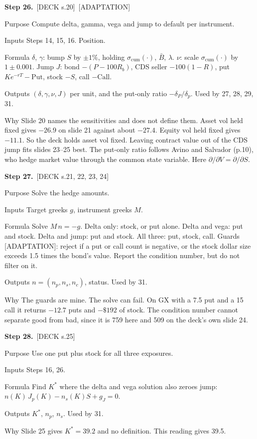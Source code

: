 \documentclass[10pt,a4paper]{article}
\newcommand{\DECK}[1]{\textsf{\footnotesize\textcolor{tagdeck}{[DECK s.#1]}}}
\newcommand{\ADAPT}{\textsf{\footnotesize\textcolor{tagadapt}{[ADAPTATION]}}}
\newenvironment{step}[3]{%
  \par\needspace{5\baselineskip}\medskip\noindent\textbf{Step #1.}\ \fn{#2}\hfill#3\par\nopagebreak\small
  \begin{description}[style=sameline,leftmargin=1.7cm,labelwidth=1.5cm,labelsep=0.2cm,itemsep=1pt,parsep=0pt,topsep=1pt,font=\small\bfseries]
}{\end{description}\normalsize}
\newcommand{\Bbar}{\bar{B}}
\newcommand{\scum}{\sigma_{\mathrm{cum}}}
\begin{document}
\begin{step}{26}{fk_greeks}{\DECK{20}\ \ADAPT}
\item[Purpose] Compute delta, gamma, vega and jump to default per instrument.
\item[Inputs] Steps 14, 15, 16. Position.
\item[Formula] $\delta$, $\gamma$: bump $S$ by $\pm1\%$, holding $\scum(\cdot)$, $\Bbar$, $\lambda$. $\nu$: scale $\scum(\cdot)$ by $1\pm0.001$. Jump $J$: bond $-(P-100R_b)$, CDS seller $-100(1-R)$, put $Ke^{-rT}-\text{Put}$, stock $-S$, call $-\text{Call}$.
\item[Outputs] $(\delta,\gamma,\nu,J)$ per unit, and the put-only ratio $-\delta_P/\delta_p$. Used by 27, 28, 29, 31.
\item[Why] Slide 20 names the sensitivities and does not define them. Asset vol held fixed gives $-26.9$ on slide 21 against about $-27.4$. Equity vol held fixed gives $-11.1$. So the deck holds asset vol fixed. Leaving contract value out of the CDS jump fits slides 23--25 best. The put-only ratio follows Avino and Salvador (p.10), who hedge market value through the common state variable. Here $\partial/\partial V=\partial/\partial S$.
\end{step}

\begin{step}{27}{solve_hedge}{\DECK{21, 22, 23, 24}}
\item[Purpose] Solve the hedge amounts.
\item[Inputs] Target greeks $g$, instrument greeks $M$.
\item[Formula] Solve $M\,n=-g$. Delta only: stock, or put alone. Delta and vega: put and stock. Delta and jump: put and stock. All three: put, stock, call. Guards \ADAPT: reject if a put or call count is negative, or the stock dollar size exceeds 1.5 times the bond's value. Report the condition number, but do not filter on it.
\item[Outputs] $n=(n_p,n_s,n_c)$, status. Used by 31.
\item[Why] The guards are mine. The solve can fail. On GX with a 7.5 put and a 15 call it returns $-12.7$ puts and $-\$192$ of stock. The condition number cannot separate good from bad, since it is 759 here and 509 on the deck's own slide 24.
\end{step}

\begin{step}{28}{optimal_strike}{\DECK{25}}
\item[Purpose] Use one put plus stock for all three exposures.
\item[Inputs] Steps 16, 26.
\item[Formula] Find $K^*$ where the delta and vega solution also zeroes jump: $n(K)\,J_p(K)-n_s(K)S+g_J=0$.
\item[Outputs] $K^*$, $n_p$, $n_s$. Used by 31.
\item[Why] Slide 25 gives $K^*=39.2$ and no definition. This reading gives 39.5.
\end{step}
\end{document}
